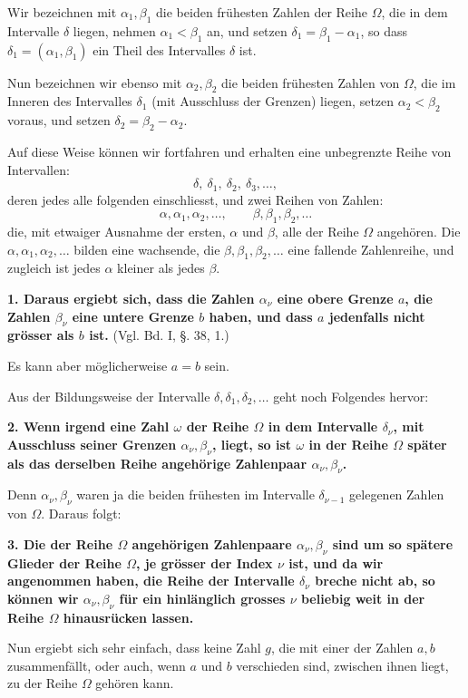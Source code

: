 \documentclass[11pt]{article}
\begin{document}
Wir bezeichnen mit $\alpha_1,\beta_1$ die beiden frühesten Zahlen der Reihe $\Omega$, die in dem Intervalle $\delta$ liegen, nehmen $\alpha_1<\beta_1$ an, und setzen $\delta_1=\beta_1-\alpha_1$, so dass $\delta_1=(\alpha_1,\beta_1)$ ein Theil des Intervalles $\delta$ ist.

Nun bezeichnen wir ebenso mit $\alpha_2,\beta_2$ die beiden frühesten Zahlen von $\Omega$, die im Inneren des Intervalles $\delta_1$ (mit Ausschluss der Grenzen) liegen, setzen $\alpha_2<\beta_2$ voraus, und setzen $\delta_2=\beta_2-\alpha_2$.

Auf diese Weise können wir fortfahren und erhalten eine unbegrenzte Reihe von Intervallen:
\[
\delta,\ \delta_1,\ \delta_2,\ \delta_3,\ldots,
\]
deren jedes alle folgenden einschliesst, und zwei Reihen von Zahlen:
\[
\alpha,\alpha_1,\alpha_2,\ldots,\qquad
\beta,\beta_1,\beta_2,\ldots
\]
die, mit etwaiger Ausnahme der ersten, $\alpha$ und $\beta$, alle der Reihe $\Omega$ angehören. Die $\alpha,\alpha_1,\alpha_2,\ldots$ bilden eine wachsende, die $\beta,\beta_1,\beta_2,\ldots$ eine fallende Zahlenreihe, und zugleich ist jedes $\alpha$ kleiner als jedes $\beta$.

\textbf{1. Daraus ergiebt sich, dass die Zahlen $\alpha_\nu$ eine obere Grenze $a$, die Zahlen $\beta_\nu$ eine untere Grenze $b$ haben, und dass $a$ jedenfalls nicht grösser als $b$ ist.} (Vgl. Bd. I, §. 38, 1.)

Es kann aber möglicherweise $a=b$ sein.

Aus der Bildungsweise der Intervalle $\delta,\delta_1,\delta_2,\ldots$ geht noch Folgendes hervor:

\textbf{2. Wenn irgend eine Zahl $\omega$ der Reihe $\Omega$ in dem Intervalle $\delta_\nu$, mit Ausschluss seiner Grenzen $\alpha_\nu,\beta_\nu$, liegt, so ist $\omega$ in der Reihe $\Omega$ später als das derselben Reihe angehörige Zahlenpaar $\alpha_\nu,\beta_\nu$.}

Denn $\alpha_\nu,\beta_\nu$ waren ja die beiden frühesten im Intervalle $\delta_{\nu-1}$ gelegenen Zahlen von $\Omega$. Daraus folgt:

\textbf{3. Die der Reihe $\Omega$ angehörigen Zahlenpaare $\alpha_\nu,\beta_\nu$ sind um so spätere Glieder der Reihe $\Omega$, je grösser der Index $\nu$ ist, und da wir angenommen haben, die Reihe der Intervalle $\delta_\nu$ breche nicht ab, so können wir $\alpha_\nu,\beta_\nu$ für ein hinlänglich grosses $\nu$ beliebig weit in der Reihe $\Omega$ hinausrücken lassen.}

Nun ergiebt sich sehr einfach, dass keine Zahl $g$, die mit einer der Zahlen $a,b$ zusammenfällt, oder auch, wenn $a$ und $b$ verschieden sind, zwischen ihnen liegt, zu der Reihe $\Omega$ gehören kann.
\end{document}
